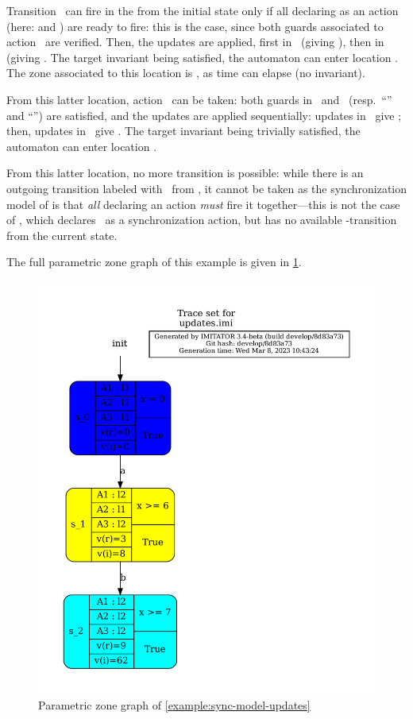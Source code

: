 \begin{example}
Transition~ can fire in the \NIPTA{} from the initial state only if all \IPTA{} declaring  as an action (here:  and ) are ready to fire: this is the case, since both guards associated to action~ are verified.
Then, the updates are applied, first in~ (giving ), then in~ (giving .
The target invariant being satisfied, the automaton can enter location .
The zone associated to this location is , as time can elapse (no invariant).

From this latter location, action~ can be taken:
both guards in~ and~ (resp.\ ``'' and ``'') are satisfied, and the updates are applied sequentially:
updates in~ give ;
then, updates in~ give .
The target invariant being trivially satisfied, the automaton can enter location .

From this latter location, no more transition is possible: while there is an outgoing transition labeled with~ from , it cannot be taken as the synchronization model of \imitator{} is that \emph{all} \IPTA{} declaring an action \emph{must} fire it together---this is not the case of , which declares~ as a synchronization action, but has no available -transition from the current state.

The full parametric zone graph of this example is given in \cref{example:sync-model-updates-PZG}.

\end{example}


\begin{figure}
	\centering
	\includegraphics[width=.5\textwidth]{examples/updates-statespace-PZG.pdf}

	\caption{Parametric zone graph of \cref{example:sync-model-updates}}
	\label{example:sync-model-updates-PZG}
\end{figure}




